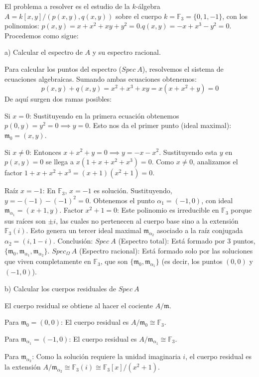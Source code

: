 \begin{sol}
    El problema a resolver es el estudio de la $k$-álgebra $A=k[x,y]/(p(x,y), q(x,y))$ sobre el cuerpo $k = \mathbb{F}_3 = \{0, 1, -1\}$, con los polinomios: $p(x,y) = x + x^2 + xy + y^2 = 0$.$q(x,y) = -x + x^3 - y^2 = 0$. Procedemos como sigue:
    
    \noindent a) Calcular el espectro de $A$ y su espectro racional.
    
    Para calcular los puntos del espectro ($Spec~A$), resolvemos el sistema de ecuaciones algebraicas. Sumando ambas ecuaciones obtenemos:
    $$p(x,y) + q(x,y) = x^2 + x^3 + xy = x(x+x^2+y) = 0$$
    De aquí surgen dos ramas posibles: 
    
    Si $x = 0$: Sustituyendo en la primera ecuación obtenemos $p(0,y) = y^2 = 0 \implies y = 0$. Esto nos da el primer punto (ideal maximal): $\mathfrak{m}_0 = (x,y)$.
    
    Si $x \neq 0$: Entonces $x+x^2+y = 0 \implies y = -x-x^2$. Sustituyendo esta $y$ en $p(x,y)=0$ se llega a $x(1+x+x^2+x^3) = 0$. Como $x \neq 0$, analizamos el factor $1+x+x^2+x^3 = (x+1)(x^2+1) = 0$. 
    
    Raíz $x = -1$: En $\mathbb{F}_3$, $x=-1$ es solución. Sustituyendo, $y = -(-1)-(-1)^2 = 0$. Obtenemos el punto $\alpha_1 = (-1,0)$, con ideal $\mathfrak{m}_{\alpha_1} = (x+1, y)$. Factor $x^2+1=0$: Este polinomio es irreducible en $\mathbb{F}_3$ porque sus raíces son $\pm i$, las cuales no pertenecen al cuerpo base sino a la extensión $\mathbb{F}_3(i)$. Esto genera un tercer ideal maximal $\mathfrak{m}_{\alpha_2}$ asociado a la raíz conjugada $\alpha_2 = (i, 1-i)$. Conclusión: $Spec~A$ (Espectro total): Está formado por 3 puntos, $\{\mathfrak{m}_0, \mathfrak{m}_{\alpha_1}, \mathfrak{m}_{\alpha_2}\}$. $Spec_\Omega~A$ (Espectro racional): Está formado solo por las soluciones que viven completamente en $\mathbb{F}_3$, que son $\{\mathfrak{m}_0, \mathfrak{m}_{\alpha_1}\}$ (es decir, los puntos $(0,0)$ y $(-1,0)$).
    
    \noindent b) Calcular los cuerpos residuales de $Spec~A$
    
    El cuerpo residual se obtiene al hacer el cociente $A/\mathfrak{m}$. 
    
    Para $\mathfrak{m}_0=(0,0)$: El cuerpo residual es $A/\mathfrak{m}_0 \cong \mathbb{F}_3$. 
    
    Para $\mathfrak{m}_{\alpha_1}=(-1,0)$: El cuerpo residual es $A/\mathfrak{m}_{\alpha_1} \cong \mathbb{F}_3$.
    
    Para $\mathfrak{m}_{\alpha_2}$: Como la solución requiere la unidad imaginaria $i$, el cuerpo residual es la extensión $A/\mathfrak{m}_{\alpha_2} \cong \mathbb{F}_3(i) \cong \mathbb{F}_3[x]/(x^2+1)$.
    

\end{sol}

